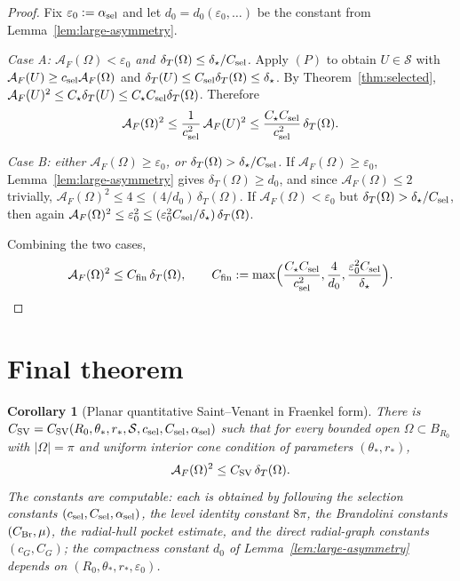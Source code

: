 \documentclass[11pt]{amsart}
\newtheorem{corollary}[theorem]{Corollary}
\newcommand{\dT}{\delta_T}
\newcommand{\AF}{\mathcal A_F}
\newcommand{\eps}{\varepsilon}
\newcommand{\Sclass}{\mathcal S}
\begin{document}
\begin{proof}
Fix \(\eps_0:=\alpha_{\rm sel}\) and let \(d_0=d_0(\eps_0,\ldots)\) be
the constant from Lemma~\ref{lem:large-asymmetry}.

\emph{Case A: \(\AF(\Omega)<\eps_0\) and
\(\dT(\Omega)\le\delta_\star/C_{\rm sel}\).}  Apply \((P)\) to obtain
\(U\in\Sclass\) with \(\AF(U)\ge c_{\rm sel}\AF(\Omega)\) and
\(\dT(U)\le C_{\rm sel}\dT(\Omega)\le\delta_\star\).  By
Theorem~\ref{thm:selected},
\(\AF(U)^2\le C_\star\dT(U)\le C_\star C_{\rm sel}\dT(\Omega)\).
Therefore
\[
   \AF(\Omega)^2\le\frac{1}{c_{\rm sel}^2}\,\AF(U)^2
      \le\frac{C_\star C_{\rm sel}}{c_{\rm sel}^2}\,\dT(\Omega).
\]

\emph{Case B: either \(\AF(\Omega)\ge\eps_0\), or
\(\dT(\Omega)>\delta_\star/C_{\rm sel}\).}
If \(\AF(\Omega)\ge\eps_0\), Lemma~\ref{lem:large-asymmetry} gives
\(\dT(\Omega)\ge d_0\), and since \(\AF(\Omega)\le 2\) trivially,
\(\AF(\Omega)^2\le 4\le (4/d_0)\,\dT(\Omega)\).
If \(\AF(\Omega)<\eps_0\) but \(\dT(\Omega)>\delta_\star/C_{\rm sel}\),
then again
\(\AF(\Omega)^2\le\eps_0^2\le(\eps_0^2 C_{\rm sel}/\delta_\star)\,
\dT(\Omega)\).

Combining the two cases,
\[
   \AF(\Omega)^2\le C_{\rm fin}\,\dT(\Omega),
   \qquad
   C_{\rm fin}:=\max\Bigl(\frac{C_\star C_{\rm sel}}{c_{\rm sel}^2},
      \frac{4}{d_0},\frac{\eps_0^2 C_{\rm sel}}{\delta_\star}\Bigr).
\]
\end{proof}

\section{Final theorem}

\begin{corollary}[Planar quantitative Saint--Venant in Fraenkel form]
\label{cor:final-SV}
There is \(C_{\rm SV}=C_{\rm SV}(R_0,\theta_*,r_*,\Sclass,
c_{\rm sel},C_{\rm sel},\alpha_{\rm sel})\)
such that for every bounded open \(\Omega\subset B_{R_0}\) with
\(|\Omega|=\pi\) and uniform interior cone condition of parameters
\((\theta_*,r_*)\),
\begin{equation}\label{eq:final-SV}
   \AF(\Omega)^2\le C_{\rm SV}\,\dT(\Omega).
\end{equation}
The constants are computable: each is obtained by following the
selection constants \((c_{\rm sel},C_{\rm sel},\alpha_{\rm sel})\), the
level identity constant \(8\pi\), the Brandolini constants
\((C_{\rm Br},\mu)\), the radial-hull pocket estimate, and the direct
radial-graph constants \((c_G,C_G)\); the compactness constant \(d_0\)
of Lemma~\ref{lem:large-asymmetry} depends on
\((R_0,\theta_*,r_*,\eps_0)\).
\end{corollary}
\end{document}
